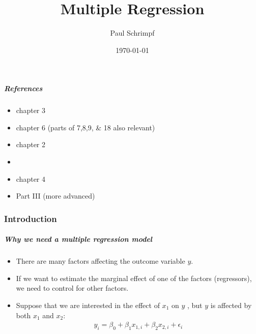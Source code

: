 \title{Multiple Regression}
\author{Paul Schrimpf}
\date{\today}

\graphicspath{{figures/}}



\frame{\titlepage}


\part{}
\frame{\partpage}

\begin{frame}
  \tableofcontents  
\end{frame}

\begin{frame}
  \frametitle{References}
  \begin{itemize}
  \item \cite{w2013} chapter 3
  \item \cite{sw2009} chapter 6 (parts of 7,8,9, \& 18 also relevant)
  \item \cite{ap2014} chapter 2
  \item \cite{bierens2010mreg}
  \item \cite{baltagi2002} chapter 4
  \item \cite{linton2017} Part III (more advanced)
  \end{itemize}
\end{frame}

\section{Introduction}

\begin{frame}[allowframebreaks]
  \frametitle{Why we need a multiple regression model}
  \begin{itemize}
  \item There are many factors affecting the outcome variable $y$.
  \item If we want to estimate the marginal effect of one of the
    factors (regressors), we need to control for other factors.
  \item Suppose that we are interested in the effect of $x_1$ on $y$ , but
    $y$ is affected by both $x_1$ and $x_2$:
    \begin{align}
      y_i = \beta_0 + \beta_1 x_{1,i} + \beta_2 x_{2,i} + \epsilon_i \label{mr1}
    \end{align}
  \end{itemize}
\end{frame}

